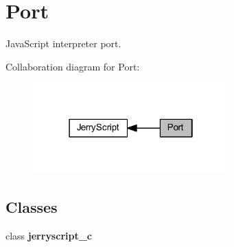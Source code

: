 \section{Port}
\label{group___port}


Java\+Script interpreter port.  


Collaboration diagram for Port\+:
\nopagebreak
\begin{figure}[H]
\begin{center}
\leavevmode
\includegraphics[width=214pt]{group___port}
\end{center}
\end{figure}
\subsection*{Classes}
\begin{DoxyCompactItemize}
\item 
class \textbf{ jerryscript\+\_\+c}
\end{DoxyCompactItemize}
